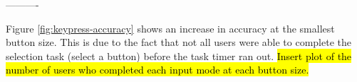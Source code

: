 ----------

Figure \ref{fig:keypress-accuracy} shows an increase in accuracy at the smallest button size. This is due to the fact that not all users were able to complete the selection task (select a button) before the task timer ran out. \hl{Insert plot of the number of users who completed each input mode at each button size.}
